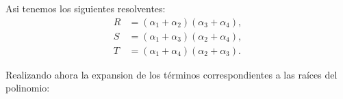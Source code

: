 \begin{solution}
  Asi tenemos los siguientes resolventes:
  \[
  \boxed{
  \begin{aligned}
  R&=(\alpha_{1}+\alpha_{2})(\alpha_{3}+\alpha_{4}),\\
  S&=(\alpha_{1}+\alpha_{3})(\alpha_{2}+\alpha_{4}),\\
  T&=(\alpha_{1}+\alpha_{4})(\alpha_{2}+\alpha_{3}).
  \end{aligned}}
  \]
  

  Realizando ahora la expansion de los términos correspondientes a las raíces del polinomio:


\end{solution}
